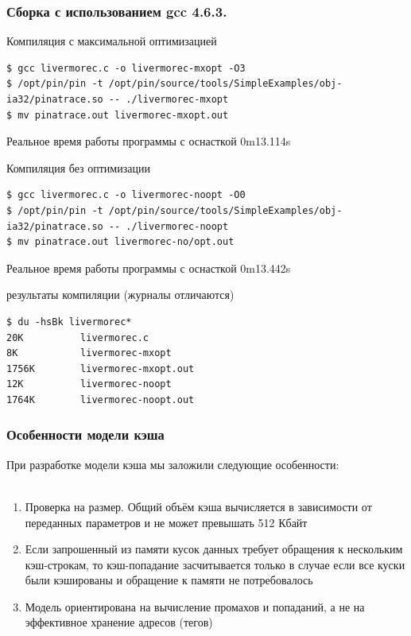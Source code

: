 \documentclass{beamer}
\begin{document}
\begin{frame}[fragile] %
\frametitle{Сборка с использованием gcc 4.6.3.}

\begin{block}{Компиляция с максимальной оптимизацией}
\begin{verbatim}
$ gcc livermorec.c -o livermorec-mxopt -O3
$ /opt/pin/pin -t /opt/pin/source/tools/SimpleExamples/obj-ia32/pinatrace.so -- ./livermorec-mxopt
$ mv pinatrace.out livermorec-mxopt.out
\end{verbatim}
\end{block}
Реальное время работы программы с оснасткой 0m13.114s

\begin{block}{Компиляция без оптимизации}
\begin{verbatim}
$ gcc livermorec.c -o livermorec-noopt -O0
$ /opt/pin/pin -t /opt/pin/source/tools/SimpleExamples/obj-ia32/pinatrace.so -- ./livermorec-noopt
$ mv pinatrace.out livermorec-no/opt.out
\end{verbatim}
\end{block}
Реальное время работы программы с оснасткой 0m13.442s

\begin{block}{результаты компиляции (журналы отличаются)}
\begin{verbatim}
$ du -hsBk livermorec*
20K          livermorec.c
8K           livermorec-mxopt
1756K        livermorec-mxopt.out
12K          livermorec-noopt
1764K        livermorec-noopt.out
\end{verbatim}
\end{block}

\end{frame}


\begin{frame}
\frametitle{Особенности модели кэша}

При разработке модели кэша мы заложили следующие особенности:\\~\\

\begin{enumerate}
\item Проверка на размер. Общий объём кэша вычисляется в зависимости от переданных параметров и не может превышать 512 Кбайт
\item Если запрошенный из памяти кусок данных требует обращения к нескольким кэш-строкам, то кэш-попадание засчитывается только в случае если все куски были кэшированы и обращение к памяти не потребовалось
\item Модель ориентирована на вычисление промахов и попаданий, а не на эффективное хранение адресов (тегов)
\end{enumerate}

\end{frame}
\end{document}
